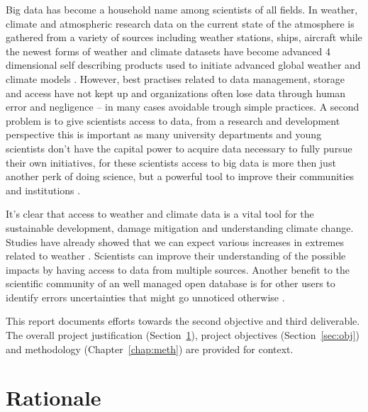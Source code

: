 \documentclass{wrcreport}
\begin{document}
Big data has become a household name among scientists of all fields.
In weather, climate and atmospheric research data on the current state
of the atmosphere is gathered from a variety of sources including
weather stations, ships, aircraft while the newest forms of weather
and climate datasets have become advanced 4 dimensional self
describing products used to initiate advanced global weather and
climate models \citep{Kaltenbock2009, Huffman2016, Skamarock2008}.
However, best practises related to data management, storage and access
have not kept up and organizations often lose data through human error
and negligence -- in many cases avoidable trough simple practices. A
second problem is to give scientists access to data, from a research
and development perspective this is important as many university
departments and young scientists don't have the capital power to
acquire data necessary to fully pursue their own initiatives, for
these scientists access to big data is more then just another perk of
doing science, but a powerful tool to improve their communities and
institutions \citep{Kitchin2014, Turner2015, Perkmann2015}.

It's clear that access to weather and climate data is a vital tool for
the sustainable development, damage mitigation and understanding
climate change. Studies have already showed that we can expect various
increases in extremes related to weather \citep{piketh2014climate}.
Scientists can improve their understanding of the possible impacts by
having access to data from multiple sources. Another benefit to the
scientific community of an well managed open database is for other
users to identify errors uncertainties that might go unnoticed
otherwise \citep{Davies2016}. 

This report documents efforts towards the second objective and third
deliverable. The overall project justification
(Section~\ref{sec:just}), project objectives (Section~\ref{sec:obj})
and methodology (Chapter~\ref{chap:meth}) are provided for context.

\section{Rationale} \label{sec:just}
\end{document}
